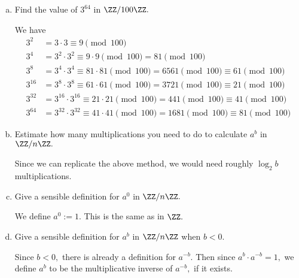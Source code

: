 \documentclass{article}
\begin{document}
\begin{itemize}
\begin{enumerate}[(a)]
			\item Find the value of $3^{64}$ in $\ZZ/100\ZZ.$ 
				\begin{soln}
					We have
					\begin{align*}
						3^2 &= 3\cdot 3 \equiv 9\pmod {100} \\
						3^4 &= 3^2\cdot 3^2 \equiv 9\cdot 9\pmod{100} = 81\pmod{100}\\
						3^8 &= 3^4\cdot 3^4 \equiv 81\cdot 81\pmod{100} = 6561\pmod{100}\equiv 61\pmod{100} \\
						3^{16} &= 3^8\cdot 3^8 \equiv 61\cdot 61\pmod{100} = 3721 \pmod{100}\equiv 21\pmod{100} \\
						3^{32} &= 3^{16}\cdot 3^{16} \equiv 21\cdot 21\pmod{100} = 441\pmod{100} \equiv 41 \pmod{100} \\
						3^{64} &= 3^{32}\cdot 3^{32}\equiv 41\cdot 41\pmod{100} = 1681 \pmod{100}\equiv81\pmod{100}
					\end{align*}
				\end{soln}

			\item Estimate how many multiplications you need to do to calculate $a^b$ in $\ZZ/n\ZZ.$
				\begin{answer*}
					Since we can replicate the above method, we would need roughly $\log_2 b$ multiplications.
				\end{answer*}

			\item Give a sensible definition for $a^0$ in $\ZZ/n\ZZ.$
				\begin{answer*}
					We define $a^0:=1.$ This is the same as in $\ZZ.$
				\end{answer*}

			\item Give a sensible definition for $a^b$ in $\ZZ/n\ZZ$ when $b<0.$ 
				\begin{answer*}
					Since $b<0,$ there is already a definition for $a^{-b}.$ Then since $a^b\cdot a^{-b}=1,$ we define $a^b$ to be the multiplicative inverse of $a^{-b},$ if it exists.
				\end{answer*}
				
		\end{enumerate}
\end{itemize}
\end{document}

